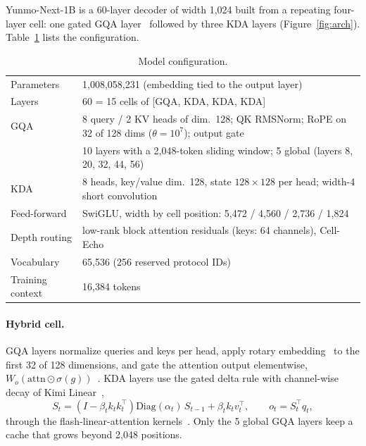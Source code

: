 \documentclass[11pt]{article}
\newcommand{\yn}{Yunmo-Next-1B}
\begin{document}
\yn{} is a 60-layer decoder of width 1,024 built from a repeating four-layer cell: one gated GQA
layer~\cite{gqa2023,gatedattn2025} followed by three KDA layers (Figure~\ref{fig:arch}). Table~\ref{tab:spec}
lists the configuration.

\begin{table}[t]
\centering\small
\caption{Model configuration.}\label{tab:spec}
\begin{tabular}{@{}lp{}@{}}
\toprule
Parameters & 1,008,058,231 (embedding tied to the output layer) \\
Layers & 60 = 15 cells of [GQA, KDA, KDA, KDA] \\
GQA & 8 query / 2 KV heads of dim.~128; QK RMSNorm; RoPE on 32 of 128 dims ($\theta=10^7$); output gate \\
 & 10 layers with a 2,048-token sliding window; 5 global (layers 8, 20, 32, 44, 56) \\
KDA & 8 heads, key/value dim.~128, state $128\times128$ per head; width-4 short convolution \\
Feed-forward & SwiGLU, width by cell position: 5,472 / 4,560 / 2,736 / 1,824 \\
Depth routing & low-rank block attention residuals (keys: 64 channels), Cell-Echo \\
Vocabulary & 65,536 (256 reserved protocol IDs) \\
Training context & 16,384 tokens \\
\bottomrule
\end{tabular}
\end{table}

\paragraph{Hybrid cell.} GQA layers normalize queries and keys per head, apply rotary
embedding~\cite{rope2021} to the first 32 of 128 dimensions, and gate the attention output elementwise,
$W_o(\mathrm{attn}\odot\sigma(g))$~\cite{gatedattn2025}. KDA layers use the gated delta rule with channel-wise
decay of Kimi Linear~\cite{kimilinear2025,gateddeltanet2024,deltanet2024},
\begin{equation}
S_t = \left(I-\beta_t k_t k_t^{\top}\right)\mathrm{Diag}(\alpha_t)\,S_{t-1} + \beta_t k_t v_t^{\top},
\qquad o_t = S_t^{\top} q_t,
\end{equation}
through the flash-linear-attention kernels~\cite{fla2024}. Only the 5 global GQA layers keep a cache that grows
beyond 2,048 positions.
\end{document}
